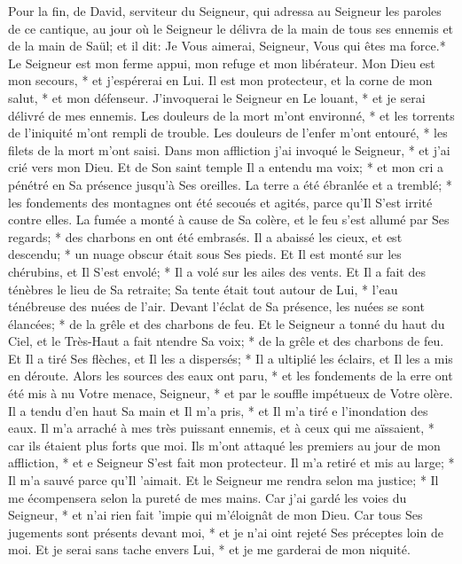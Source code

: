 Pour la fin, de David, serviteur du Seigneur, qui adressa au Seigneur les paroles de ce cantique, au jour où le Seigneur le délivra de la main de tous ses ennemis et de la main de Saül; et il dit:
Je Vous aimerai, Seigneur, Vous qui êtes ma force.*
Le Seigneur est mon ferme appui, mon refuge et mon libérateur. Mon Dieu est mon secours, * et j'espérerai en Lui. Il est mon protecteur, et la corne de mon salut, * et mon défenseur.
J'invoquerai le Seigneur en Le louant, * et je serai délivré de mes ennemis.
Les douleurs de la mort m'ont environné, * et les torrents de l'iniquité m'ont rempli de trouble.
Les douleurs de l'enfer m'ont entouré, * les filets de la mort m'ont saisi.
Dans mon affliction j'ai invoqué le Seigneur, * et j'ai crié vers mon Dieu. Et de Son saint temple Il a entendu ma voix; * et mon cri a pénétré en Sa présence jusqu'à Ses oreilles.
La terre a été ébranlée et a tremblé; * les fondements des montagnes ont été secoués et agités, parce qu'Il S'est irrité contre elles.
La fumée a monté à cause de Sa colère, et le feu s'est allumé par Ses regards; * des charbons en ont été embrasés.
Il a abaissé les cieux, et est descendu; * un nuage obscur était sous Ses pieds.
Et Il est monté sur les chérubins, et Il S'est envolé; * Il a volé sur les ailes des vents.
Et Il a fait des ténèbres le lieu de Sa retraite; Sa tente était tout autour de Lui, * l'eau ténébreuse des nuées de l'air.
Devant l'éclat de Sa présence, les nuées se sont élancées; * de la grêle et des charbons de feu.
Et le Seigneur a tonné du haut du Ciel, et le Très-Haut a fait ntendre Sa voix; * de la grêle et des charbons de feu.
Et Il a tiré Ses flèches, et Il les a dispersés; * Il a ultiplié les éclairs, et Il les a mis en déroute.
Alors les sources des eaux ont paru, * et les fondements de la erre ont été mis à nu Votre menace, Seigneur, * et par le souffle impétueux de Votre olère.
Il a tendu d'en haut Sa main et Il m'a pris, * et Il m'a tiré e l'inondation des eaux.
Il m'a arraché à mes très puissant ennemis, et à ceux qui me aïssaient, * car ils étaient plus forts que moi.
Ils m'ont attaqué les premiers au jour de mon affliction, * et e Seigneur S'est fait mon protecteur.
Il m'a retiré et mis au large; * Il m'a sauvé parce qu'Il 'aimait.
Et le Seigneur me rendra selon ma justice; * Il me écompensera selon la pureté de mes mains.
Car j'ai gardé les voies du Seigneur, * et n'ai rien fait 'impie qui m'éloignât de mon Dieu.
Car tous Ses jugements sont présents devant moi, * et je n'ai oint rejeté Ses préceptes loin de moi.
Et je serai sans tache envers Lui, * et je me garderai de mon niquité.
